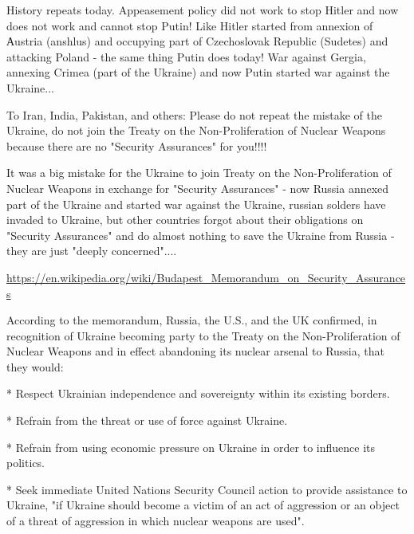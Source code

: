  
 
 
 
 


History repeats today. Appeasement policy did not work to stop Hitler and now
does not work and cannot stop Putin! Like Hitler started from annexion of
Аustria (anshlus) and occupying part of Czechoslovak Republic (Sudetes) and
attacking Poland - the same thing Putin does today! War against Gergia,
annexing Crimea (part of the Ukraine) and now Putin started war against the
Ukraine...

To Iran, India, Pakіstan, and others: Please do not repeat the mistake of the
Ukraine, do not join the Treaty on the Non-Proliferation of Nuclear Weapons
because there are no "Security Assurances" for you!!!!

It was a big mistake for the Ukraine to join Treaty on the Non-Proliferation of
Nuclear Weapons in exchange for "Security Assurances" - now Russia annexed part
of the Ukraine and started war against the Ukraine, russian solders have
invaded to Ukraine, but other countries forgot about their obligations on
"Security Assurances" and do almost nothing to save the Ukraine from Russia -
they are just "deeply concerned"....

\url{https://en.wikipedia.org/wiki/Budapest_Memorandum_on_Security_Assurances}

According to the memorandum, Russia, the U.S., and the UK confirmed, in
recognition of Ukraine becoming party to the Treaty on the Non-Proliferation of
Nuclear Weapons and in effect abandoning its nuclear arsenal to Russia, that
they would:

* Respect Ukrainian independence and sovereignty within its existing borders.

* Refrain from the threat or use of force against Ukraine.

* Refrain from using economic pressure on Ukraine in order to influence its
politics.

* Seek immediate United Nations Security Council action to provide assistance
to Ukraine, "if Ukraine should become a victim of an act of aggression or an
object of a threat of aggression in which nuclear weapons are used".


